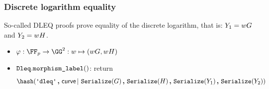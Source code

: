 \documentclass[11pt]{article}
\begin{document}

\subsubsection{Discrete logarithm equality}
So-called DLEQ proofs prove equality of the discrete logarithm, that is: $Y_1 = wG$ and $Y_2 = wH$.

\begin{itemize}
  \item $\varphi:\FF_p\to\GG^2:w\mapsto (wG,wH)$
  \item $\texttt{Dleq}.\texttt{morphism\_label}()$: return
  \[
    \hash(\dleqlabel \concat \curvectx \concatblock \serialize(G) \concat \serialize(H) \concat \serialize(\statement_1) \concat \serialize(\statement_2))
  \]
\end{itemize}
\end{document}
